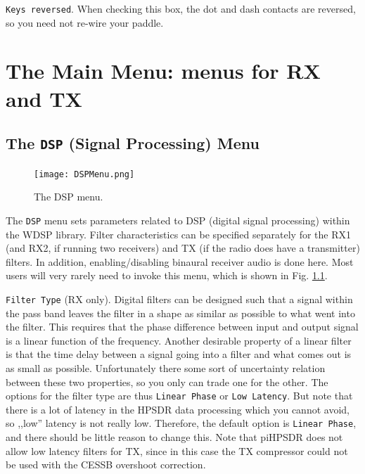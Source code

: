 \documentclass[12pt]{book}
\def\rett#1{\texttt{\color{red}#1}}
\def\bltt#1{\texttt{\color{blue}#1}}
\def\pH{pi\-HPSDR\xspace}
\begin{document}
\rett{Keys reversed}. When checking this box, the dot and dash contacts
are reversed, so you need not re-wire your paddle.


\chapter[Menus for RX and TX]{The Main Menu: menus for RX and TX}

\section{The \texttt{DSP} (Signal Processing) Menu}

\begin{figure}[ht]
\center
\texttt{[image: DSPMenu.png]}
\caption{The DSP menu.}
\label{fig:DSPMenu}
\end{figure}

The \bltt{DSP} menu sets parameters related to DSP (digital signal processing)
within the WDSP library.
Filter characteristics can be specified separately for the RX1 (and RX2, if
running two receivers) and TX (if the radio does have a transmitter)
filters. In addition, enabling/disabling binaural receiver audio
is done here.  Most users will
very rarely need to invoke this menu, which is shown
in Fig. \ref{fig:DSPMenu}.

\rett{Filter Type} (RX only). Digital filters can be designed such that a signal within the
pass band leaves the filter in a shape as similar as possible
to what went into the filter. This requires that the phase
difference between input and output signal is a linear
function of the frequency. Another desirable property
of a linear filter is that the time delay between a signal
going into a filter and what comes out is as small as
possible. Unfortunately there some sort of uncertainty
relation between these two properties, so you only can
trade one for the other. The options for the filter type
are thus \rett{Linear Phase} or \rett{Low Latency}.
But note that there is a lot of latency in the HPSDR data
processing which you cannot avoid, so ,,low'' latency
is not really low. Therefore, the default option
is \rett{Linear Phase}, and there should be little reason
to change this. Note that \pH does not allow low latency
filters for TX, since in this case the TX compressor
could not be used with the CESSB overshoot correction.
\end{document}
